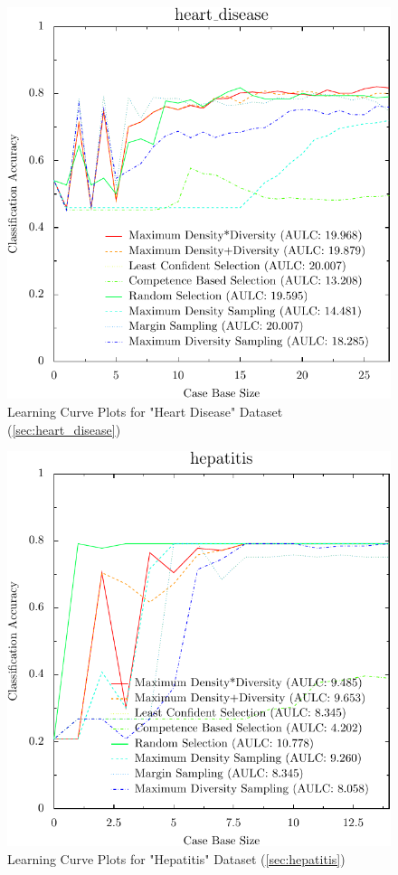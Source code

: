 \documentclass[a4paper,11pt]{report}
\begin{document}
\begin{figure}[h!]
\includegraphics{./Plots/heart_disease}
\caption{Learning Curve Plots for "Heart Disease" Dataset (\ref{sec:heart_disease})}
\end{figure}

\begin{figure}[h!]
\includegraphics{./Plots/hepatitis}
\caption{Learning Curve Plots for "Hepatitis" Dataset (\ref{sec:hepatitis})}
\end{figure}
\end{document}
